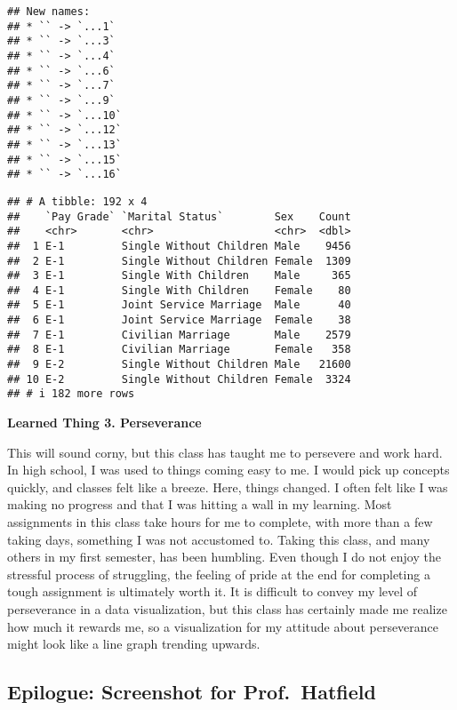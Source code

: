 \documentclass[
]{article}
\begin{document}
\begin{verbatim}
## New names:
## * `` -> `...1`
## * `` -> `...3`
## * `` -> `...4`
## * `` -> `...6`
## * `` -> `...7`
## * `` -> `...9`
## * `` -> `...10`
## * `` -> `...12`
## * `` -> `...13`
## * `` -> `...15`
## * `` -> `...16`
\end{verbatim}

\begin{verbatim}
## # A tibble: 192 x 4
##    `Pay Grade` `Marital Status`        Sex    Count
##    <chr>       <chr>                   <chr>  <dbl>
##  1 E-1         Single Without Children Male    9456
##  2 E-1         Single Without Children Female  1309
##  3 E-1         Single With Children    Male     365
##  4 E-1         Single With Children    Female    80
##  5 E-1         Joint Service Marriage  Male      40
##  6 E-1         Joint Service Marriage  Female    38
##  7 E-1         Civilian Marriage       Male    2579
##  8 E-1         Civilian Marriage       Female   358
##  9 E-2         Single Without Children Male   21600
## 10 E-2         Single Without Children Female  3324
## # i 182 more rows
\end{verbatim}

\textbf{Learned Thing 3. Perseverance}

This will sound corny, but this class has taught me to persevere and
work hard. In high school, I was used to things coming easy to me. I
would pick up concepts quickly, and classes felt like a breeze. Here,
things changed. I often felt like I was making no progress and that I
was hitting a wall in my learning. Most assignments in this class take
hours for me to complete, with more than a few taking days, something I
was not accustomed to. Taking this class, and many others in my first
semester, has been humbling. Even though I do not enjoy the stressful
process of struggling, the feeling of pride at the end for completing a
tough assignment is ultimately worth it. It is difficult to convey my
level of perseverance in a data visualization, but this class has
certainly made me realize how much it rewards me, so a visualization for
my attitude about perseverance might look like a line graph trending
upwards.

\hypertarget{epilogue-screenshot-for-prof.-hatfield}{%
\subsection{Epilogue: Screenshot for
Prof.~Hatfield}\label{epilogue-screenshot-for-prof.-hatfield}}
\end{document}

